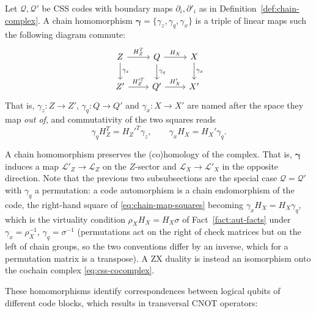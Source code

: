 \begin{definition}\label{def:chain-map}
Let $\mathcal Q, \mathcal Q'$ be CSS codes with boundary maps $\partial_i, \partial'_i$ as in Definition~\ref{def:chain-complex}. A chain homomorphism
$\mathbf \gamma = \{\gamma_z, \gamma_q,\gamma_x\}$ is a triple of linear maps such the following diagram commute:
\begin{equation}\label{eq:chain-map}
    \begin{tikzcd}[ampersand replacement=\&]
        {Z} \& {Q} \& {X} \\
        {Z'} \& {Q'} \& {X'}
        \arrow["{H_Z^T}", from=1-1, to=1-2]
        \arrow["{H_X}", from=1-2, to=1-3]
        \arrow["{H_Z'^T}", from=2-1, to=2-2]
        \arrow["{H_X'}", from=2-2, to=2-3]
        \arrow["{\gamma_z}", from=1-1, to=2-1]
        \arrow["{\gamma_q}", from=1-2, to=2-2]
        \arrow["{\gamma_x}", from=1-3, to=2-3]
    \end{tikzcd}
\end{equation}
That is, $\gamma_z: Z\to Z'$, $\gamma_q: Q\to Q'$ and $\gamma_x: X\to X'$ are named after the space they map \emph{out of}, and commutativity of the two squares reads
\begin{equation}\label{eq:chain-map-squares}
    \gamma_q H_Z^T = H_Z'^T\gamma_z,\qquad
    \gamma_x H_X = H_X'\gamma_q .
\end{equation}
\end{definition}
 
A chain homomorphism preserves the (co)homology of the complex. That is, $\mathbf\gamma$ induces a map $\mathcal L'_Z \to \mathcal L_Z$ on the $Z$-sector and $\mathcal L_X \to \mathcal L'_X$ in the opposite direction. Note that the previous two subsubsections are the special case $\mathcal Q = \mathcal Q'$ with $\gamma_q$ a permutation: a code automorphism is a chain endomorphism of the code, the right-hand square of \eqref{eq:chain-map-squares} becoming $\gamma_x H_X = H_X\gamma_q$, which is the virtuality condition $\rho_XH_X = H_X\sigma$ of Fact~\ref{fact:aut-facts} under $\gamma_x = \rho_X^{-1}$, $\gamma_q = \sigma^{-1}$ (permutations act on the right of check matrices but on the left of chain groups, so the two conventions differ by an inverse, which for a permutation matrix is a transpose). A ZX duality is instead an isomorphism onto the cochain complex \eqref{eq:css-cocomplex}.
 
These homomorphisms identify correspondences between logical qubits of different code blocks, which results in transversal CNOT operators:
 
